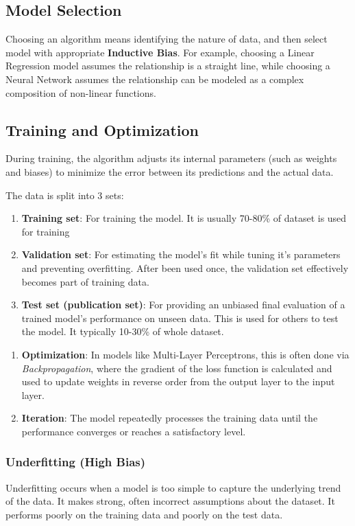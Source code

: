 \documentclass[12pt]{article}
\begin{document}
\subsection{Model Selection}

Choosing an algorithm means identifying the nature of data, and then select model with appropriate \textbf{Inductive Bias}. For example, choosing a Linear Regression model assumes the relationship is a straight line, while choosing a Neural Network assumes the relationship can be modeled as a complex composition of non-linear functions.

\subsection{Training and Optimization}

During training, the algorithm adjusts its internal parameters (such as weights and biases) to minimize the error between its predictions and the actual data.

The data is split into 3 sets:
\begin{enumerate}
  \item \textbf{Training set}: For training the model. It is usually 70-80\% of dataset is used for training
  \item \textbf{Validation set}: For estimating the model's fit while tuning it's parameters and preventing overfitting. After been used once, the validation set effectively becomes part of training data.
  \item \textbf{Test set (publication set)}: For providing an unbiased final evaluation of a trained model's performance on unseen data. This is used for others to test the model. It typically 10-30\% of whole dataset.
\end{enumerate}

\begin{enumerate}
  \item \textbf{Optimization}: In models like Multi-Layer Perceptrons, this is often done via \textit{Backpropagation}, where the gradient of the loss function is calculated and used to update weights in reverse order from the output layer to the input layer.
  \item \textbf{Iteration}: The model repeatedly processes the training data until the performance converges or reaches a satisfactory level.
\end{enumerate}

\subsubsection{Underfitting (High Bias)}
Underfitting occurs when a model is too simple to capture the underlying trend of the data. It makes strong, often incorrect assumptions about the dataset. It performs poorly on the training data and poorly on the test data.
\end{document}
